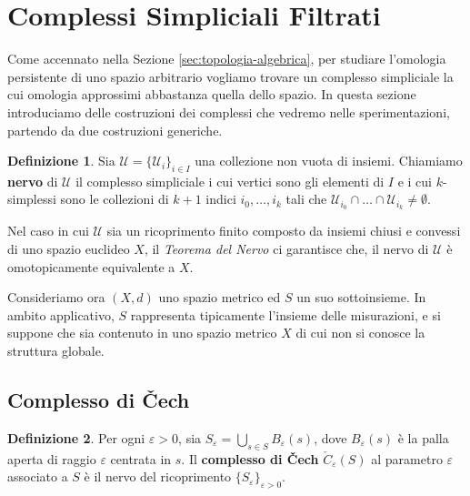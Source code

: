 \documentclass[a4paper, 12pt]{article}
\theoremstyle{definition}
\newtheorem{definition}{Definizione}[section]
\theoremstyle{remark}
\begin{document}
\section{Complessi Simpliciali Filtrati}

Come accennato nella Sezione \ref{sec:topologia-algebrica}, per studiare l'omologia persistente di uno spazio arbitrario vogliamo trovare un complesso simpliciale la cui omologia approssimi abbastanza quella dello spazio. In questa sezione introduciamo delle costruzioni dei complessi che vedremo nelle sperimentazioni, partendo da due costruzioni generiche.

\begin{definition}
    Sia $\mathcal{U} = \{\mathcal{U}_i\}_{i \in I}$ una collezione non vuota di insiemi. Chiamiamo \textbf{nervo} di $\mathcal{U}$ il complesso simpliciale i cui vertici sono gli elementi di $I$ e i cui $k$-simplessi sono le collezioni di $k+1$ indici $i_0, \ldots, i_k$ tali che $\mathcal{U}_{i_0} \cap \dots \cap \mathcal{U}_{i_k} \neq \emptyset$.
\end{definition}

Nel caso in cui $\mathcal{U}$ sia un ricoprimento finito composto da insiemi chiusi e convessi di uno spazio euclideo $X$, il \textit{Teorema del Nervo}\cite{Edelsbrunner} ci garantisce che, il nervo di $\mathcal{U}$ è omotopicamente equivalente a $X$.



Consideriamo ora $(X,d)$ uno spazio metrico ed $S$ un suo sottoinsieme. In ambito applicativo, $S$ rappresenta tipicamente l'insieme delle misurazioni, e si suppone che sia contenuto in uno spazio metrico $X$ di cui non si conosce la struttura globale.

\subsection*{Complesso di \v{C}ech}
\begin{definition}
    Per ogni $\varepsilon > 0$, sia $S_{\varepsilon} = \bigcup_{s \in S} B_{\varepsilon}(s)$, dove $B_{\varepsilon}(s)$ è la palla aperta di raggio $\varepsilon$ centrata in $s$. Il \textbf{complesso di \v{C}ech} $\check{C}_{\varepsilon}(S)$ al parametro $\varepsilon$ associato a $S$ è il nervo del ricoprimento $\{S_{\varepsilon}\}_{\varepsilon > 0}$.
\end{definition}

\end{document}
